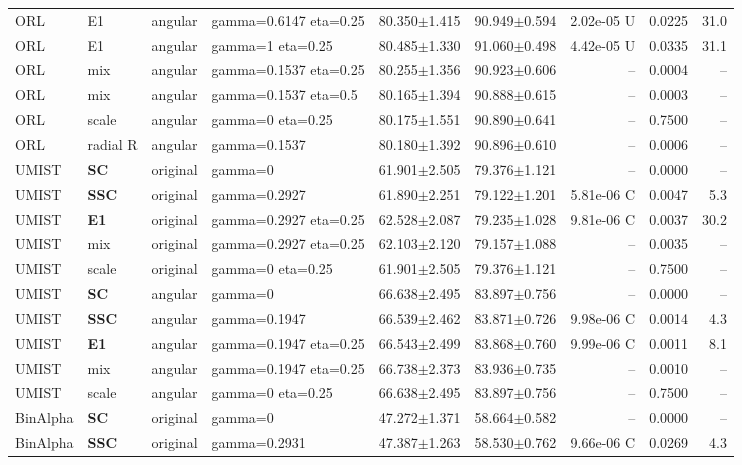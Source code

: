 \begin{longtable}{lllp{.14\linewidth}rrrrr}
ORL & E1 & angular & gamma=0.6147 eta=0.25 & 80.350$\pm$1.415 & 90.949$\pm$0.594 & 2.02e-05 U & 0.0225 & 31.0\\
ORL & E1 & angular & gamma=1 eta=0.25 & 80.485$\pm$1.330 & 91.060$\pm$0.498 & 4.42e-05 U & 0.0335 & 31.1\\
ORL & mix & angular & gamma=0.1537 eta=0.25 & 80.255$\pm$1.356 & 90.923$\pm$0.606 & -- & 0.0004 & --\\
ORL & mix & angular & gamma=0.1537 eta=0.5 & 80.165$\pm$1.394 & 90.888$\pm$0.615 & -- & 0.0003 & --\\
ORL & scale & angular & gamma=0 eta=0.25 & 80.175$\pm$1.551 & 90.890$\pm$0.641 & -- & 0.7500 & --\\
ORL & radial R & angular & gamma=0.1537 & 80.180$\pm$1.392 & 90.896$\pm$0.610 & -- & 0.0006 & --\\
UMIST & \textbf{SC} & original & gamma=0 & 61.901$\pm$2.505 & 79.376$\pm$1.121 & -- & 0.0000 & --\\
UMIST & \textbf{SSC} & original & gamma=0.2927 & 61.890$\pm$2.251 & 79.122$\pm$1.201 & 5.81e-06 C & 0.0047 & 5.3\\
UMIST & \textbf{E1} & original & gamma=0.2927 eta=0.25 & 62.528$\pm$2.087 & 79.235$\pm$1.028 & 9.81e-06 C & 0.0037 & 30.2\\
UMIST & mix & original & gamma=0.2927 eta=0.25 & 62.103$\pm$2.120 & 79.157$\pm$1.088 & -- & 0.0035 & --\\
UMIST & scale & original & gamma=0 eta=0.25 & 61.901$\pm$2.505 & 79.376$\pm$1.121 & -- & 0.7500 & --\\
UMIST & \textbf{SC} & angular & gamma=0 & 66.638$\pm$2.495 & 83.897$\pm$0.756 & -- & 0.0000 & --\\
UMIST & \textbf{SSC} & angular & gamma=0.1947 & 66.539$\pm$2.462 & 83.871$\pm$0.726 & 9.98e-06 C & 0.0014 & 4.3\\
UMIST & \textbf{E1} & angular & gamma=0.1947 eta=0.25 & 66.543$\pm$2.499 & 83.868$\pm$0.760 & 9.99e-06 C & 0.0011 & 8.1\\
UMIST & mix & angular & gamma=0.1947 eta=0.25 & 66.738$\pm$2.373 & 83.936$\pm$0.735 & -- & 0.0010 & --\\
UMIST & scale & angular & gamma=0 eta=0.25 & 66.638$\pm$2.495 & 83.897$\pm$0.756 & -- & 0.7500 & --\\
BinAlpha & \textbf{SC} & original & gamma=0 & 47.272$\pm$1.371 & 58.664$\pm$0.582 & -- & 0.0000 & --\\
BinAlpha & \textbf{SSC} & original & gamma=0.2931 & 47.387$\pm$1.263 & 58.530$\pm$0.762 & 9.66e-06 C & 0.0269 & 4.3\\

\end{longtable}
